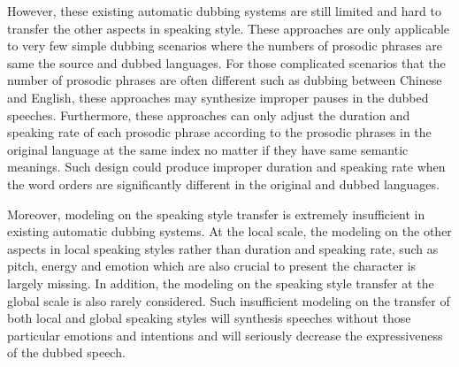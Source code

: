 
However, these existing automatic dubbing systems are still limited and hard to transfer the other aspects in speaking style.
These approaches are only applicable to very few simple dubbing scenarios 
where the numbers of prosodic phrases are same the source and dubbed languages.
For those complicated scenarios that the number of prosodic phrases are often different 
such as dubbing between Chinese and English, 
these approaches may synthesize improper pauses in the dubbed speeches. %
Furthermore, these approaches 
can only adjust the duration and speaking rate of each prosodic phrase according to the prosodic phrases in the original language at the same index no matter if they have same semantic meanings.
Such design
could produce improper duration and speaking rate when the word orders are significantly different in the original and dubbed languages.

Moreover, modeling on the speaking style transfer is extremely insufficient in existing automatic dubbing systems.
At the local scale, 
the modeling on the other aspects in local speaking styles rather than duration and speaking rate,
such as pitch, energy and emotion 
which are also crucial to present the character
is largely missing.
In addition, 
the modeling on the speaking style transfer at the global scale is also rarely considered. %
Such insufficient modeling on the transfer of both local and global speaking styles will
synthesis speeches without those particular emotions and intentions 
and will seriously decrease the expressiveness of the dubbed speech.

